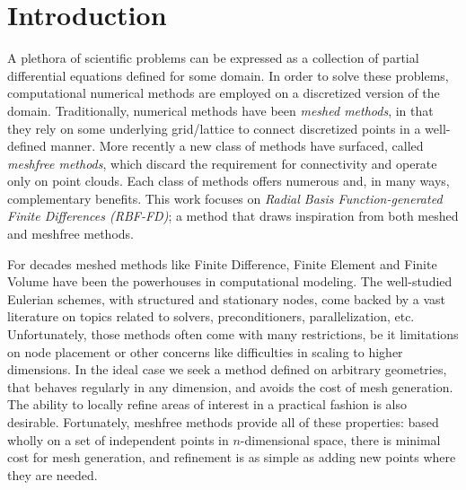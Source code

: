 \documentclass[11pt]{report}
\begin{document}
\fi



\chapter{Introduction}
\label{chap:introduction}

A plethora of scientific problems can be expressed as a collection of partial differential equations defined for some domain. In order to solve these 
problems, computational numerical methods are employed on a discretized version of the domain. Traditionally, numerical methods have been \emph{meshed methods}, in that they rely on some underlying grid/lattice to connect discretized points in a well-defined manner. More recently a new class of methods have surfaced, called \emph{meshfree methods}, which discard the requirement for connectivity and operate only on point clouds. Each class of methods offers numerous and, in many ways, complementary benefits. This work focuses on \emph{Radial Basis Function-generated Finite Differences (RBF-FD)}; a method that draws inspiration from both meshed and meshfree methods.



For decades meshed methods like Finite Difference, Finite Element and Finite Volume have been the powerhouses in computational modeling. The well-studied Eulerian schemes, with structured and stationary nodes, come backed by a vast literature on topics related to solvers, preconditioners, parallelization, etc. Unfortunately, those methods often come with many restrictions, be it limitations on node placement or other concerns like difficulties in scaling to higher dimensions. In the ideal case we seek a method defined on arbitrary geometries, that behaves regularly in any dimension, and avoids the cost of 
mesh generation. The ability to locally refine areas of interest in a practical fashion is also desirable. Fortunately, meshfree 
methods provide all of these properties: based wholly on a set of independent points in $n$-dimensional space, 
there is minimal cost for mesh generation, and refinement is as simple as adding new points where 
they are needed. 
\end{document}
